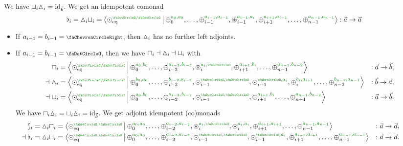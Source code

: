 \documentclass[a4paper]{memoir}
\begin{document}
\begin{example}
\begin{itemize}
\[		\]
		We have ${\sqcup}_i {\vartriangle}_i = \mathrm{id}_{\vec b}$. We get an idempotent comonad
		\[
			\flat_i = \cohdisc_i \cohfget_i = \reshlist{\nonpol_\eqtydeg\pmrhom{\npolar}{\npolar}}{\pospol_0\pmrhom{a_0}{a_0}, \ldots, \pospol_{i-1}\pmrhom{a_{i-1}}{a_{i-1}}, \isopol_{i-1}\pmrhom{a_{i-1}}{a_i}, \pospol_{i+1}\pmrhom{a_{i+1}}{a_{i+1}}, \ldots, \pospol_{n-1}\pmrhom{a_{n-1}}{a_{n-1}}} : \vec a \to \vec a
		\]
		\begin{itemize}
			\item If $a_{i-1} = b_{i-1} = \ypolar$, then ${\vartriangle}_i$ has no further left adjoints.
			\item If $a_{i-1} = b_{i-1} = \npolar$, then we have ${\sqcap}_i \dashv {\vartriangle}_i \dashv {\sqcup}_i$ with
			\begin{align*}
				\cohpi_i &= \reshlist{\nonpol_\eqtydeg\pmrhom{\npolar}{\npolar}}{\pospol_0\pmrhom{a_0}{b_0}, \ldots, \pospol_{i-2}\pmrhom{a_{i-2}}{b_{i-2}}, \isopol_i\pmrhom{a_i}{\npolar}, \pospol_{i+1}\pmrhom{a_{i+1}}{b_i}, \ldots, \pospol_{n-1}\pmrhom{a_{n-1}}{b_{n-2}}}
				&: \vec a \to \vec b, \\
				\dashv
				\cohdisc_i &= \reshlist{\nonpol_\eqtydeg\pmrhom{\npolar}{\npolar}}{\pospol_0\pmrhom{b_0}{a_0}, \ldots, \pospol_{i-2}\pmrhom{b_{i-2}}{a_{i-2}}, \nonpol_{i-1}\pmrhom{\npolar}{\npolar}, \nonpol_{i-1}\pmrhom{\npolar}{a_i}, \pospol_i\pmrhom{b_i}{a_{i+1}}, \ldots, \pospol_{n-2}\pmrhom{b_{n-2}}{a_{n-1}}}
				&: \vec b \to \vec a, \\
				\dashv
				\cohfget_i &= \reshlist{\nonpol_\eqtydeg\pmrhom{\npolar}{\npolar}}{\pospol_0\pmrhom{a_0}{b_0}, \ldots, \pospol_{i-2}\pmrhom{a_{i-2}}{b_{i-2}}, \nonpol_{i-1}\pmrhom{\npolar}{\npolar}, \pospol_{i+1}\pmrhom{a_{i+1}}{b_i}, \ldots, \pospol_{n-1}\pmrhom{a_{n-1}}{b_{n-2}}}
				&: \vec a \to \vec b.
			\end{align*}
			We have ${\sqcap}_i {\vartriangle}_i = {\sqcup}_i {\vartriangle}_i = \mathrm{id}_{\vec b}$. We get adjoint idempotent (co)monads
			\begin{align*}
				{}\hspace{-3em}
				\shp_i = \cohdisc_i \cohpi_i &= \reshlist{\nonpol_\eqtydeg\pmrhom{\npolar}{\npolar}}{\pospol_0\pmrhom{a_0}{a_0}, \ldots, \pospol_{i-2}\pmrhom{a_{i-2}}{a_{i-2}}, \isopol_i\pmrhom{a_i}{\npolar}, \isopol_i\pmrhom{a_i}{a_i}, \pospol_{i+1}\pmrhom{a_{i+1}}{a_{i+1}}, \ldots, \pospol_{n-1}\pmrhom{a_{n-1}}{a_{n-1}}} &: \vec a \to \vec a, \\
				{}\hspace{-3em}
				\dashv
				\flat_i = \cohdisc_i \cohfget_i &= \reshlist{\nonpol_\eqtydeg\pmrhom{\npolar}{\npolar}}{\pospol_0\pmrhom{a_0}{a_0}, \ldots, \pospol_{i-2}\pmrhom{a_{i-2}}{a_{i-2}}, \nonpol_{i-1}\pmrhom{\npolar}{\npolar}, \nonpol_{i-1}\pmrhom{\npolar}{a_i}, \pospol_{i+1}\pmrhom{a_{i+1}}{a_{i+1}}, \ldots, \pospol_{n-1}\pmrhom{a_{n-1}}{a_{n-1}}} &: \vec a \to \vec a.

\end{align*}
\end{itemize}
\end{itemize}
\end{example}
\end{document}
